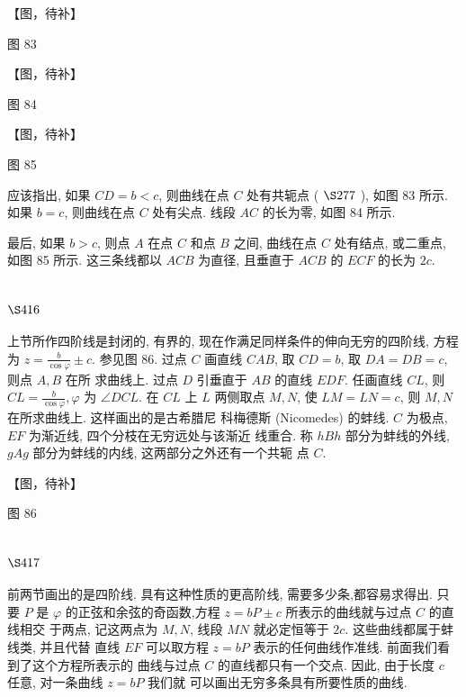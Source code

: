 【图，待补】

图 83


【图，待补】

图 84


【图，待补】

图 85

应该指出, 如果 $C D=b<c$, 则曲线在点 $C$ 处有共轭点 ( $\S 277$ ), 如图 83 所示. 如果 $b=c$, 则曲线在点 $C$ 处有尖点. 线段 $A C$ 的长为零, 如图 84 所示.

最后, 如果 $b>c$, 则点 $A$ 在点 $C$ 和点 $B$ 之间, 曲线在点 $C$ 处有结点, 或二重点, 如图 85 所示. 这三条线都以 $A C B$ 为直径, 且垂直于 $A C B$ 的 $E C F$ 的长为 $2 c$.

\section{$\S 416$}

上节所作四阶线是封闭的, 有界的, 现在作满足同样条件的伸向无穷的四阶线, 方程 为 $z=\frac{b}{\cos \varphi} \pm c$. 参见图 86. 过点 $C$ 画直线 $C A B$, 取 $C D=b$, 取 $D A=D B=c$, 则点 $A, B$ 在所 求曲线上. 过点 $D$ 引垂直于 $A B$ 的直线 $E D F$. 任画直线 $C L$, 则 $C L=\frac{b}{\cos \varphi}, \varphi$ 为 $\angle D C L$. 在 $C L$ 上 $L$ 两侧取点 $M, N$, 使 $L M=L N=c$, 则 $M, N$ 在所求曲线上. 这样画出的是古希腊尼 科梅德斯 (Nicomedes) 的蚌线. $C$ 为极点, $E F$ 为渐近线, 四个分枝在无穷远处与该渐近 线重合. 称 $h B h$ 部分为蚌线的外线, $g A g$ 部分为蚌线的内线, 这两部分之外还有一个共轭 点 $C$.


【图，待补】

图 86

\section{$\S 417$}

前两节画出的是四阶线. 具有这种性质的更高阶线, 需要多少条,都容易求得出. 只 要 $P$ 是 $\varphi$ 的正弦和余弦的奇函数,方程 $z=b P \pm c$ 所表示的曲线就与过点 $C$ 的直线相交 于两点, 记这两点为 $M, N$, 线段 $M N$ 就必定恒等于 $2 c$. 这些曲线都属于蚌线类, 并且代替 直线 $E F$ 可以取方程 $z=b P$ 表示的任何曲线作准线. 前面我们看到了这个方程所表示的 曲线与过点 $C$ 的直线都只有一个交点. 因此, 由于长度 $c$ 任意, 对一条曲线 $z=b P$ 我们就 可以画出无穷多条具有所要性质的曲线.

